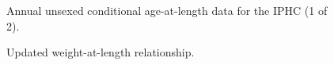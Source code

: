 \documentclass[
]{scrartcl}
\begin{document}
\begin{figure}


\caption{\label{fig-IPHC_agecomps2}Annual unsexed conditional
age-at-length data for the IPHC (1 of 2).}

\end{figure}%

\begin{figure}


\caption{\label{fig-LWrel}Updated weight-at-length relationship.}

\end{figure}%
\end{document}
